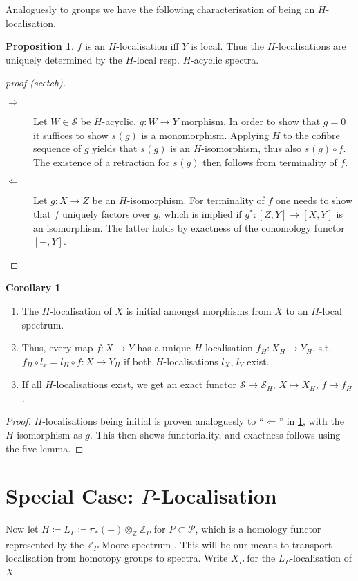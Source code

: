 \documentclass[english]{scrartcl}
\theoremstyle{definition}
\newtheorem*{Prop}{Proposition}
\newtheorem*{Cor}{Corollary}
\theoremstyle{remark}
\newcommand*{\ifftext}{iff}
\newcommand*{\Z}[1][]{\mathds{Z}_{#1}}  %
\newcommand*{\Spectra}{\mathcal{S}} %
\newcommand*{\conem}[2][]{s^{#1}(#2)}  %
\newcommand*{\Ps}{P}  %
\newcommand*{\PS}{\mathcal{P}} %
\newcommand*{\Hiso}{$H$-isomorphism}  %
\newcommand*{\pistar}[2][*]{\pi_{#1}(#2)}  %
\newcommand*{\timesZ}[1][\Ps]{\otimes_{\Z} \Z[#1]}  %
\newcommand*{\LP}[1][\Ps]{L_{#1}}  %
\begin{document}
Analoguesly to groups we have the following characterisation of being
an $H$-localisation.
\begin{Prop}\label{thm:charhlocal}
  $f$ is an $H$-localisation \ifftext{} $Y$ is local.
  Thus the $H$-localisations are uniquely determined by the $H$-local
  resp. $H$-acyclic spectra.
  \begin{proof}[proof (scetch)]
    \cite[compare][Lemma 7.1]{margolis}
    \begin{description}
    \item[$\Rightarrow$]
      Let $W\in\Spectra$ be $H$-acyclic, $g\colon W\to Y$ morphism. In
      order to show that $g=0$ it suffices to show $\conem g$ is a
      monomorphism. Applying $H$ to the cofibre sequence of $g$ yields
      that $\conem g$ is an \Hiso, thus also $\conem g \circ f$.
      The existence of a retraction for $\conem g$ then follows from
      terminality of $f$.
    \item[$\Leftarrow$]
      Let $g\colon X\to Z$ be an \Hiso. For terminality of $f$ one
      needs to show that $f$ uniquely factors over $g$, which is
      implied if $g^*\colon [Z,Y]\to [X,Y]$ is an isomorphism.
      The latter holds by exactness of the cohomology functor
      $[-,Y]$.
      \qedhere
    \end{description}
  \end{proof}
\end{Prop}
\begin{Cor}
  \begin{enumerate}
  \item The $H$-localisation of $X$ is initial amongst morphisms
    from $X$ to an $H$-local spectrum.
  \item Thus, every map $f\colon X\to Y$ has a unique $H$-localisation
    $f_H\colon X_H\to Y_H$, s.t.
    $f_H\circ l_x = l_H\circ f\colon X\to Y_H$
    if both $H$-localisations $l_X$, $l_Y$ exist.
  \item If all $H$-localisations exist, we get an exact functor
    $\Spectra\to \Spectra_H$, $X\mapsto X_H$, $f\mapsto f_H$.
  \end{enumerate}
  \begin{proof}
    $H$-localisations being initial is proven analoguesly to
    \enquote{$\Leftarrow$} in \ref{thm:charhlocal}, with the \Hiso{}
    as $g$. This then shows functoriality, and exactness follows using
    the five lemma. 
  \end{proof}
\end{Cor}

\section{Special Case: $\Ps$-Localisation}
Now let $H\coloneqq \LP\coloneqq \pistar{-}\timesZ$ for
$\Ps\subset\PS$, which is a homology functor represented by the
$\Z[\Ps]$-Moore-spectrum \cite[p.\,111, Exc. (a)]{margolis}.
This will be our means to transport localisation from homotopy groups
to spectra.
Write $X_{\Ps}$ for the $\LP$-localisation of $X$.
\end{document}
